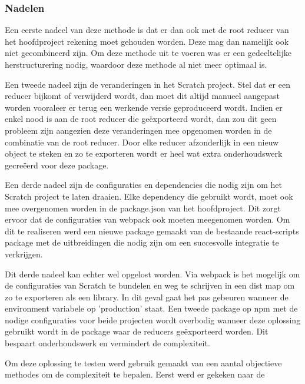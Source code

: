 \subsubsection{Nadelen}
Een eerste nadeel van deze methode is dat er dan ook met de root reducer van het hoofdproject rekening moet gehouden worden. Deze mag dan namelijk ook niet gecombineerd zijn. Om deze methode uit te voeren was er een gedeeltelijke herstructurering nodig, waardoor deze methode al niet meer optimaal is. 

Een tweede nadeel zijn de veranderingen in het Scratch project. Stel dat er een reducer bijkomt of verwijderd wordt, dan moet dit altijd manueel aangepast worden vooraleer er terug een werkende versie geproduceerd wordt. Indien er enkel nood is aan de root reducer die geëxporteerd wordt, dan zou dit geen probleem zijn aangezien deze veranderingen mee opgenomen worden in de combinatie van de root reducer. Door elke reducer afzonderlijk in een nieuw object te steken en zo te exporteren wordt er heel wat extra onderhoudswerk gecreëerd voor deze package.  

Een derde nadeel zijn de configuraties en dependencies die nodig zijn om het Scratch project te laten draaien. 
Elke dependency die gebruikt wordt, moet ook mee overgenomen worden in de package.json van het hoofdproject. Dit zorgt ervoor dat de configuraties van webpack ook moeten meegenomen worden. Om dit te realiseren werd een nieuwe package gemaakt van de bestaande react-scripts package met de uitbreidingen die nodig zijn om een succesvolle integratie te verkrijgen.

Dit derde nadeel kan echter wel opgelost worden. Via webpack is het mogelijk om de configuraties van Scratch te bundelen en weg te schrijven in een dist map om zo te exporteren als een library. In dit geval gaat het pas gebeuren wanneer de environment variabele op 'production' staat. Een tweede package op npm met de nodige configuraties voor beide projecten wordt overbodig wanneer deze oplossing gebruikt wordt in de package waar de reducers geëxporteerd worden. Dit bespaart onderhoudswerk en vermindert de complexiteit.

Om deze oplossing te testen werd gebruik gemaakt van een aantal objectieve methodes om de complexiteit te bepalen. Eerst werd er gekeken naar de 


